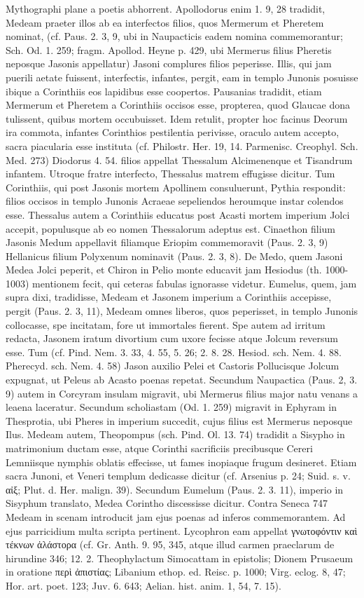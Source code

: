 \documentclass[landscape, a4paper, 11pt, oneside, polutonikogreek, german]{article}
\begin{document}
Mythographi plane a poetis abhorrent. Apollodorus enim 1. 9, 28 tradidit, Medeam praeter illos ab ea interfectos filios, quos Mermerum et Pheretem nominat, (cf. Paus. 2. 3, 9, ubi in Naupacticis eadem nomina commemorantur; Sch. Od. 1. 259; fragm. Apollod. Heyne p. 429, ubi Mermerus filius Pheretis neposque Jasonis appellatur) Jasoni complures filios peperisse. Illis, qui jam puerili aetate fuissent, interfectis, infantes, pergit, eam in templo Junonis posuisse ibique a Corinthiis eos lapidibus esse coopertos. Pausanias tradidit, etiam Mermerum et Pheretem a Corinthiis occisos esse, propterea, quod Glaucae dona tulissent, quibus mortem occubuisset. Idem retulit, propter hoc facinus Deorum ira commota, infantes Corinthios pestilentia perivisse, oraculo autem accepto, sacra piacularia esse instituta (cf. Philostr. Her. 19, 14. Parmenisc. Creophyl. Sch. Med. 273) Diodorus 4. 54. filios appellat Thessalum Alcimenenque et Tisandrum infantem. Utroque fratre interfecto, Thessalus matrem effugisse dicitur. Tum Corinthiis, qui post Jasonis mortem Apollinem consuluerunt, Pythia respondit: filios occisos in templo Junonis Acraeae sepeliendos heroumque instar colendos esse. Thessalus autem a Corinthiis educatus post Acasti mortem imperium Jolci accepit, populusque ab eo nomen Thessalorum adeptus est. Cinaethon filium Jasonis Medum appellavit filiamque Eriopim commemoravit (Paus. 2. 3, 9) Hellanicus filium Polyxenum nominavit (Paus. 2. 3, 8). De Medo, quem Jasoni Medea Jolci peperit, et Chiron in Pelio monte educavit jam Hesiodus (th. 1000-1003) mentionem fecit, qui ceteras fabulas ignorasse videtur. Eumelus, quem, jam supra dixi, tradidisse, Medeam et Jasonem imperium a Corinthiis accepisse, pergit (Paus. 2. 3, 11), Medeam omnes liberos, quos peperisset, in templo Junonis collocasse, spe incitatam, fore ut immortales fierent. Spe autem ad irritum redacta, Jasonem iratum divortium cum uxore fecisse atque Jolcum reversum esse. Tum (cf. Pind. Nem. 3. 33, 4. 55, 5. 26; 2. 8. 28. Hesiod. sch. Nem. 4. 88. Pherecyd. sch. Nem. 4. 58) Jason auxilio Pelei et Castoris Pollucisque Jolcum expugnat, ut Peleus ab Acasto poenas repetat. Secundum Naupactica (Paus. 2, 3. 9) autem in Corcyram insulam migravit, ubi Mermerus filius major natu venans a leaena laceratur. Secundum scholiastam (Od. 1. 259) migravit in Ephyram in Thesprotia, ubi Pheres in imperium succedit, cujus filius est Mermerus neposque Ilus. Medeam autem, Theopompus (sch. Pind. Ol. 13. 74) tradidit a Sisypho in matrimonium ductam esse, atque Corinthi sacrificiis precibusque Cereri Lemniisque nymphis oblatis effecisse, ut fames inopiaque frugum desineret. Etiam sacra Junoni, et Veneri templum dedicasse dicitur (cf. Arsenius p. 24; Suid. s. v. αἰξ; Plut. d. Her. malign. 39). Secundum Eumelum (Paus. 2. 3. 11), imperio in Sisyphum translato, Medea Corintho discessisse dicitur. Contra Seneca 747 Medeam in scenam introducit jam ejus poenas ad inferos commemorantem. Ad ejus parricidium multa scripta pertinent. Lycophron eam appellat γνωτοφόντιν καὶ τέκνων ἀλάστορα (cf. Gr. Anth. 9. 95, 345, atque illud carmen praeclarum de hirundine 346; 12. 2. Theophylactum Simocattam in epistolis; Dionem Prusaeum in oratione περὶ ἀπιστίας; Libanium ethop. ed. Reisc. p. 1000; Virg. eclog. 8, 47; Hor. art. poet. 123; Juv. 6. 643; Aelian. hist. anim. 1, 54, 7. 15).
\end{document}
